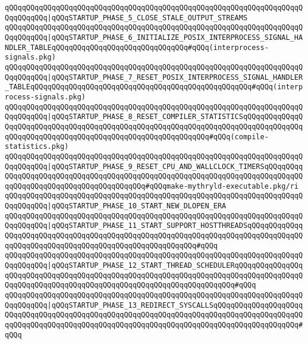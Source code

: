\verb|qQQqqQQqqQQqqQQqqQQqqQQqqQQqqQQqqQQqqQQqqQQqqQQqqQQqqQQqqQQqqQQqqQQqqQQqqQQqqQQq|\verb#|qQQqSTARTUP_PHASE_5_CLOSE_STALE_OUTPUT_STREAMS#\newline
\verb|qQQqqQQqqQQqqQQqqQQqqQQqqQQqqQQqqQQqqQQqqQQqqQQqqQQqqQQqqQQqqQQqqQQqqQQqqQQqqQQq|\verb#|qQQqSTARTUP_PHASE_6_INITIALIZE_POSIX_INTERPROCESS_SIGNAL_HANDLER_TABLEqQQqqQQqqQQqqQQqqQQqqQQqqQQqqQQq#\verb|#qQQq(interprocess-signals.pkg)|\newline
\verb|qQQqqQQqqQQqqQQqqQQqqQQqqQQqqQQqqQQqqQQqqQQqqQQqqQQqqQQqqQQqqQQqqQQqqQQqqQQqqQQq|\verb#|qQQqSTARTUP_PHASE_7_RESET_POSIX_INTERPROCESS_SIGNAL_HANDLER_TABLEqQQqqQQqqQQqqQQqqQQqqQQqqQQqqQQqqQQqqQQqqQQqqQQqqQQq#\verb|#qQQq(interprocess-signals.pkg)|\newline
\verb|qQQqqQQqqQQqqQQqqQQqqQQqqQQqqQQqqQQqqQQqqQQqqQQqqQQqqQQqqQQqqQQqqQQqqQQqqQQqqQQq|\verb#|qQQqSTARTUP_PHASE_8_RESET_COMPILER_STATISTICSqQQqqQQqqQQqqQQqqQQqqQQqqQQqqQQqqQQqqQQqqQQqqQQqqQQqqQQqqQQqqQQqqQQqqQQqqQQqqQQqqQQqqQQqqQQqqQQqqQQqqQQqqQQqqQQqqQQqqQQqqQQqqQQqqQQq#\verb|#qQQq(compile-statistics.pkg)|\newline
\verb|qQQqqQQqqQQqqQQqqQQqqQQqqQQqqQQqqQQqqQQqqQQqqQQqqQQqqQQqqQQqqQQqqQQqqQQqqQQqqQQq|\verb#|qQQqSTARTUP_PHASE_9_RESET_CPU_AND_WALLCLOCK_TIMERSqQQqqQQqqQQqqQQqqQQqqQQqqQQqqQQqqQQqqQQqqQQqqQQqqQQqqQQqqQQqqQQqqQQqqQQqqQQqqQQqqQQqqQQqqQQqqQQqqQQqqQQqqQQqqQQq#\verb|#qQQqmake-mythryld-executable.pkg/ri|\newline
\verb|qQQqqQQqqQQqqQQqqQQqqQQqqQQqqQQqqQQqqQQqqQQqqQQqqQQqqQQqqQQqqQQqqQQqqQQqqQQqqQQq|\verb#|qQQqSTARTUP_PHASE_10_START_NEW_DLOPEN_ERA#\newline
\verb|qQQqqQQqqQQqqQQqqQQqqQQqqQQqqQQqqQQqqQQqqQQqqQQqqQQqqQQqqQQqqQQqqQQqqQQqqQQqqQQq|\verb#|qQQqSTARTUP_PHASE_11_START_SUPPORT_HOSTTHREADSqQQqqQQqqQQqqQQqqQQqqQQqqQQqqQQqqQQqqQQqqQQqqQQqqQQqqQQqqQQqqQQqqQQqqQQqqQQqqQQqqQQqqQQqqQQqqQQqqQQqqQQqqQQqqQQqqQQqqQQqqQQqqQQq#\verb|#qQQq|\newline
\verb|qQQqqQQqqQQqqQQqqQQqqQQqqQQqqQQqqQQqqQQqqQQqqQQqqQQqqQQqqQQqqQQqqQQqqQQqqQQqqQQq|\verb#|qQQqSTARTUP_PHASE_12_START_THREAD_SCHEDULERqQQqqQQqqQQqqQQqqQQqqQQqqQQqqQQqqQQqqQQqqQQqqQQqqQQqqQQqqQQqqQQqqQQqqQQqqQQqqQQqqQQqqQQqqQQqqQQqqQQqqQQqqQQqqQQqqQQqqQQqqQQqqQQqqQQqqQQqqQQq#\verb|#qQQq|\newline
\verb|qQQqqQQqqQQqqQQqqQQqqQQqqQQqqQQqqQQqqQQqqQQqqQQqqQQqqQQqqQQqqQQqqQQqqQQqqQQqqQQq|\verb#|qQQqSTARTUP_PHASE_13_REDIRECT_SYSCALLSqQQqqQQqqQQqqQQqqQQqqQQqqQQqqQQqqQQqqQQqqQQqqQQqqQQqqQQqqQQqqQQqqQQqqQQqqQQqqQQqqQQqqQQqqQQqqQQqqQQqqQQqqQQqqQQqqQQqqQQqqQQqqQQqqQQqqQQqqQQqqQQqqQQqqQQqqQQqqQQq#\verb|#qQQq|\newline
